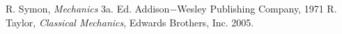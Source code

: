 

\nocite{*}
%
%

\begin{thebibliography}{00}
 R. Symon, \textit{Mechanics} 3a. Ed. Addison$-$Wesley Publishing Company, 1971
 R. Taylor, \textit{Classical Mechanics}, Edwards Brothers, Inc. 2005.
\end{thebibliography}






